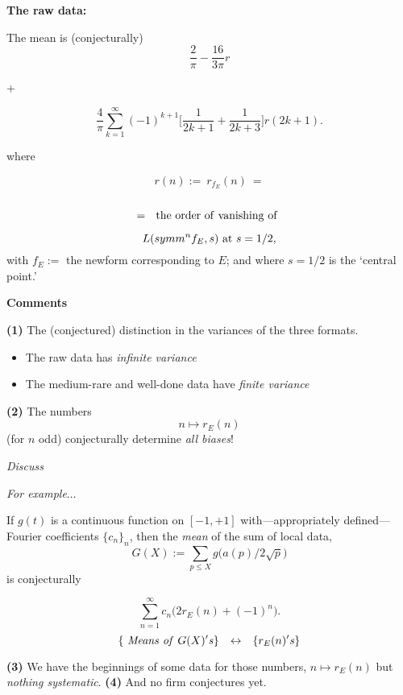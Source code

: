 \documentclass[12pt]{beamer}
\theoremstyle{definition}
\begin{document}
 \begin{frame}\vskip20pt
{\Large  \vskip20pt 
    
      \centerline{\bf The raw data:}\vskip5pt  The  mean is  (conjecturally) $$
{\frac{2}{\pi}}- {\frac{16}{3\pi}}r$$ \vskip5pt \centerline{ + }  \vskip5pt $$ {\frac{4}{\pi}} \sum_{k=1}^{\infty}  (-1)^{k+1}\big[{\frac{1}{2k+1}} + {\frac{1}{2k+3}}\big]r({2k+1}).
$$ \centerline{  where }  } \end{frame}
  
 \begin{frame}\vskip20pt
{\Large  \vskip20pt $$r(n):= \ r_{f_E}(n)\ =$$ \\
$$=\ \  {\rm the\ order\ of\ vanishing\ of\ }$$

$$L(symm^nf_E, s)\ {\rm at}\ s=1/2,$$ \vskip20pt with $f_E:=$ the newform  corresponding to  $E$; and where  $s=1/2$ is the `central point.'  } \end{frame}
  
 \begin{frame}
{\Large  \vskip20pt  \centerline{ \bf Comments}
\vskip20pt {\bf(1)}  The (conjectured) distinction in the variances of the three formats.\vskip20pt
  \begin{itemize} \item   The raw data has {\it infinite variance} \item The medium-rare and well-done data have {\it finite variance}\end{itemize}} \end{frame}
 \begin{frame}
{\Large  \vskip20pt   {\bf(2)} The numbers \vskip20pt $$n \mapsto r_E(n)$$ \vskip20pt (for $n$ odd) conjecturally determine {\it all biases}!} \vskip20pt \centerline{\it Discuss}\end{frame}
 \begin{frame}\vskip20pt  
{\Large  \vskip20pt  \centerline{\it For example$\dots$}  \vskip20pt   If    $g(t)$ is a continuous function on $[-1,+1]$  with---appropriately defined---Fourier coefficients $\{c_n\}_n$, then the {\it mean} of the sum of local data,  $$G(X):= \sum_{p\le X}g\big(a(p)/2{\sqrt p}\big)$$  is conjecturally}\end{frame}
 \begin{frame}\vskip20pt  
{\Large  \vskip20pt    $$\sum_{n=1}^{\infty}  c_n\big(2r_E(n)+(-1)^n\big).$$\vskip20pt  
$$\{ {\rm{\it  \  Means\ of\ }} G(X){\rm{\it 's}}\} \ \ \  {\leftrightarrow}\ \ \  \{r_E(n){\rm{\it 's}}\}$$}\end{frame}
 \begin{frame}\vskip20pt
{\Large  \vskip20pt
  {\bf(3)} We have the beginnings of some data for those numbers, $n \mapsto r_E(n)$
 \vskip20pt
 but {\it nothing systematic}.  \vskip20pt
  {\bf(4)} And no firm conjectures yet.}\end{frame}
  
\end{document}
